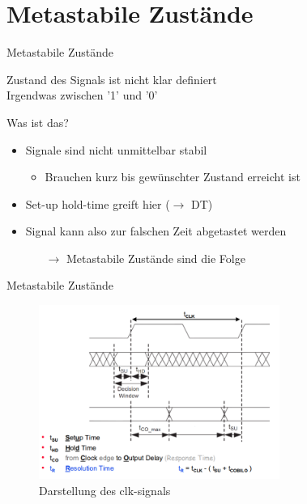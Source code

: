   \section{Metastabile Zustände}
  \begin{frame} {Metastabile Zustände}
    \begin{alertblock} {}
      Zustand des Signals ist nicht klar definiert\\
      Irgendwas zwischen '1' und '0'
    \end{alertblock}
    \begin{block} {Was ist das?}
      \begin{itemize}
        \item Signale sind nicht unmittelbar stabil
        \begin{itemize}
          \item Brauchen kurz bis gewünschter Zustand erreicht ist
        \end{itemize}
        \item Set-up hold-time greift hier ($\rightarrow$ DT)
        \item Signal kann also zur \glqq{}falschen\grqq{} Zeit abgetastet werden
        \begin{itemize}
          \item [$\rightarrow$] Metastabile Zustände sind die Folge
        \end{itemize}
      \end{itemize}
    \end{block}
  \end{frame}


  \begin{frame} {Metastabile Zustände}
    \begin{figure}[ht]
      \centering
      \includegraphics[width=0.7\textwidth]{figs/signalverlauf.png}
      \caption{Darstellung des clk-signals}
    \end{figure}
  \end{frame}

